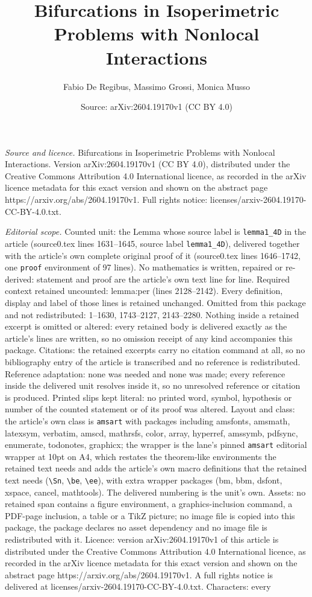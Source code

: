 \documentclass[10pt,a4paper]{amsart}
\title[Bifurcations in Isoperimetric Problems with Nonlocal Interac]{Bifurcations in Isoperimetric Problems with Nonlocal Interactions}
\author{Fabio De Regibus, Massimo Grossi, Monica Musso}
\date{Source: arXiv:2604.19170v1 (CC BY 4.0)}
\begin{document}
\maketitle

\noindent\emph{Source and licence.} Bifurcations in Isoperimetric Problems with Nonlocal Interactions. Version arXiv:2604.19170v1 (CC BY 4.0), distributed under the Creative Commons Attribution 4.0 International licence, as recorded in the arXiv licence metadata for this exact version and shown on the abstract page https://arxiv.org/abs/2604.19170v1. Full rights notice: licenses/arxiv-2604.19170-CC-BY-4.0.txt.\par\smallskip

\noindent\textit{Editorial scope.} Counted unit: the Lemma whose source label is \texttt{lemma1\_4D} in the article (source0.tex lines 1631--1645, source label \texttt{lemma1\_4D}), delivered together with the article's own complete original proof of it (source0.tex lines 1646--1742, one \texttt{proof} environment of 97 lines). No mathematics is written, repaired or re-derived: statement and proof are the article's own text line for line. Required context retained uncounted: lemma:per (lines 2128--2142). Every definition, display and label of those lines is retained unchanged. Omitted from this package and not redistributed: 1--1630, 1743--2127, 2143--2280. Nothing inside a retained excerpt is omitted or altered: every retained body is delivered exactly as the article's lines are written, so no omission receipt of any kind accompanies this package. Citations: the retained excerpts carry no citation command at all, so no bibliography entry of the article is transcribed and no reference is redistributed. Reference adaptation: none was needed and none was made; every reference inside the delivered unit resolves inside it, so no unresolved reference or citation is produced. Printed slips kept literal: no printed word, symbol, hypothesis or number of the counted statement or of its proof was altered. Layout and class: the article's own class is \texttt{amsart} with packages including amsfonts, amsmath, latexsym, verbatim, amscd, mathrsfs, color, array, hyperref, amssymb, pdfsync, enumerate, todonotes, graphicx; the wrapper is the lane's pinned \texttt{amsart} editorial wrapper at 10pt on A4, which restates the theorem-like environments the retained text needs and adds the article's own macro definitions that the retained text needs (\texttt{\textbackslash Sn}, \texttt{\textbackslash be}, \texttt{\textbackslash ee}), with extra wrapper packages (bm, bbm, dsfont, xspace, cancel, mathtools). The delivered numbering is the unit's own. Assets: no retained span contains a figure environment, a graphics-inclusion command, a PDF-page inclusion, a table or a TikZ picture; no image file is copied into this package, the package declares no asset dependency and no image file is redistributed with it. Licence: version arXiv:2604.19170v1 of this article is distributed under the Creative Commons Attribution 4.0 International licence, as recorded in the arXiv licence metadata for this exact version and shown on the abstract page https://arxiv.org/abs/2604.19170v1. A full rights notice is delivered at licenses/arxiv-2604.19170-CC-BY-4.0.txt. Characters: every 
\end{document}
